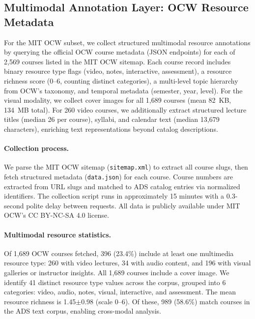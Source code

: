\documentclass[sigconf,review]{acmart}
\newcommand{\NumOCWTotal}{2,569}          %
\newcommand{\NumOCWFetched}{1,689}        %
\newcommand{\NumOCWMatched}{989}          %
\newcommand{\NumOCWVideo}{260}            %
\newcommand{\NumOCWAudio}{34}             %
\newcommand{\NumOCWVisual}{196}           %
\newcommand{\NumOCWMultimedia}{396}       %
\newcommand{\OCWMultimediaPercent}{23.4\%} %
\newcommand{\OCWMatchRate}{58.6\%}        %
\newcommand{\MeanRichness}{1.45}          %
\newcommand{\StdRichness}{0.98}           %
\newcommand{\NumResourceTypes}{41}        %
\newcommand{\NumImages}{1,689}            %
\begin{document}
\subsection{Multimodal Annotation Layer: OCW Resource Metadata}
\label{subsec:multimodal}

For the MIT OCW subset, we collect structured multimodal resource annotations by querying the official OCW course metadata (JSON endpoints) for each of {\NumOCWTotal} courses listed in the MIT OCW sitemap.
Each course record includes binary resource type flags (video, notes, interactive, assessment), a resource richness score (0--6, counting distinct categories), a multi-level topic hierarchy from OCW's taxonomy, and temporal metadata (semester, year, level).
For the visual modality, we collect cover images for all {\NumImages} courses (mean 82~KB, 134~MB total).
For {\NumOCWVideo} video courses, we additionally extract structured lecture titles (median 26 per course), syllabi, and calendar text (median 13,679 characters), enriching text representations beyond catalog descriptions.

\paragraph{Collection process.}
We parse the MIT OCW sitemap (\texttt{sitemap.xml}) to extract all course slugs, then fetch structured metadata (\texttt{data.json}) for each course.
Course numbers are extracted from URL slugs and matched to ADS catalog entries via normalized identifiers.
The collection script runs in approximately 15 minutes with a 0.3-second polite delay between requests.
All data is publicly available under MIT OCW's CC BY-NC-SA 4.0 license.

\paragraph{Multimodal resource statistics.}
Of {\NumOCWFetched} OCW courses fetched, {\NumOCWMultimedia} ({\OCWMultimediaPercent}) include at least one multimedia resource type: {\NumOCWVideo} with video lectures, {\NumOCWAudio} with audio content, and {\NumOCWVisual} with visual galleries or instructor insights.
All {\NumOCWFetched} courses include a cover image.
We identify {\NumResourceTypes} distinct resource type values across the corpus, grouped into 6 categories: video, audio, notes, visual, interactive, and assessment.
The mean resource richness is {\MeanRichness}$\pm${\StdRichness} (scale 0--6).
Of these, {\NumOCWMatched} ({\OCWMatchRate}) match courses in the ADS text corpus, enabling cross-modal analysis.
\end{document}
